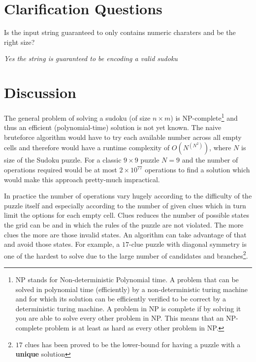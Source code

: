\section{Clarification Questions}

\begin{QandA}
	\item \begin{questionitem} \begin{question} Is the input string guaranteed to only contains numeric charaters and be the right size?  \end{question} 	 
    \begin{answered}
		\textit{Yes the string is guaranteed to be encoding a valid sudoku}
	\end{answered} \end{questionitem}	
\end{QandA}

\section{Discussion}
\label{sudoku:sec:discussion}
The general problem of solving a sudoku (of size $n\times m$) is NP-complete\footnote{NP stands for
Non-deterministic Polynomial time. A problem that can be solved in polynomial time (efficiently) by
a non-deterministic turing machine and for which its solution can be efficiently verified to be
correct by a deterministic turing machine. A problem in NP is complete if by solving it you are able
to solve every other problem in NP. This means that an NP-complete problem is at least as hard as
every other problem in NP.} and thus an efficient (polynomial-time) solution is not yet known. The
naive bruteforce algorithm would have to try each available number across all empty cells and
therefore would have a runtime complexity of $O(N^{(N^2)})$, where $N$ is size of the Sudoku puzzle.
For a classic  $9 \times 9$ puzzle $N = 9$ and the number of operations required would be at most $2
\times 10^{77}$ operations to find a solution which would make this approach pretty-much
impractical. 

In practice the number of operations vary hugely according to the difficulty of the puzzle itself
and especially according to the number of given clues which in turn limit the options for each empty
cell. Clues reduces the number of possible states the grid can be and in which the rules of the
puzzle are not violated. The more clues the more are those invalid states. An algorithm can take
advantage of that and avoid those states. For example, a $17$-clue puzzle with diagonal symmetry is
one of the hardest to solve due to the large number of candidates and branches\footnote{$17$ clues
has been proved to be the lower-bound for having a puzzle with a \textbf{unique} solution}. 

